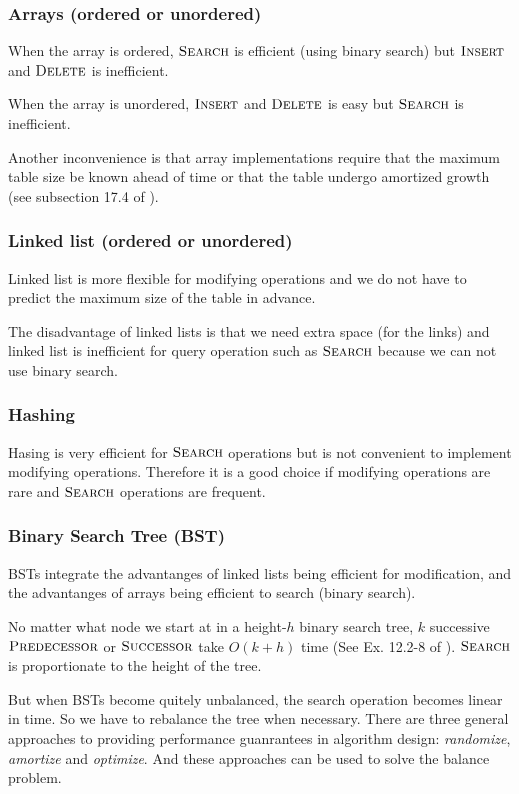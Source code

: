 \documentclass[12pt]{article}
\begin{document}
\subsubsection{Arrays (ordered or unordered)}
When the array is ordered, $\textnormal{\scshape Search}$ is efficient (using binary
search) but $\textnormal{\scshape Insert}$ and $\textnormal{\scshape Delete}$ is inefficient.

When the array is unordered, $\textnormal{\scshape Insert}$ and $\textnormal{\scshape Delete}$ is easy
but $\textnormal{\scshape Search}$ is inefficient.

Another inconvenience is that array implementations require that the
maximum table size be known ahead of time or that the table undergo
amortized growth (see subsection 17.4 of \cite{clrs2}).

\subsubsection{Linked list (ordered or unordered)}
Linked list is more flexible for modifying operations and we do not have to
predict the maximum size of the table in advance.

The disadvantage of linked lists is that we need extra space (for the
links) and linked list is inefficient for query operation such as
$\textnormal{\scshape Search}$ because we can not use binary search.

\subsubsection{Hashing}
Hasing is very efficient for $\textnormal{\scshape Search}$ operations but is not
convenient to implement modifying operations.  Therefore it is a good
choice if modifying operations are rare and $\textnormal{\scshape Search}$ operations are
frequent.

\subsubsection{Binary Search Tree (BST)}
BSTs integrate the advantanges of linked lists being efficient for
modification, and the advantanges of arrays being efficient to search
(binary search).  

No matter what node we start at in a height-$h$ binary search tree, $k$
successive $\textnormal{\scshape Predecessor}$ or $\textnormal{\scshape Successor}$ take $O(k+h)$ time 
(See Ex. 12.2-8 of \cite{clrs2}).  $\textnormal{\scshape Search}$ is proportionate to 
the height of the tree.

But when BSTs become quitely unbalanced, the search operation becomes
linear in time.  So we have to rebalance the tree when necessary.  There
are three general approaches to providing performance guanrantees in
algorithm design: {\em randomize}, {\em amortize} and {\em optimize}.  And
these approaches can be used to solve the balance problem.
\end{document}
